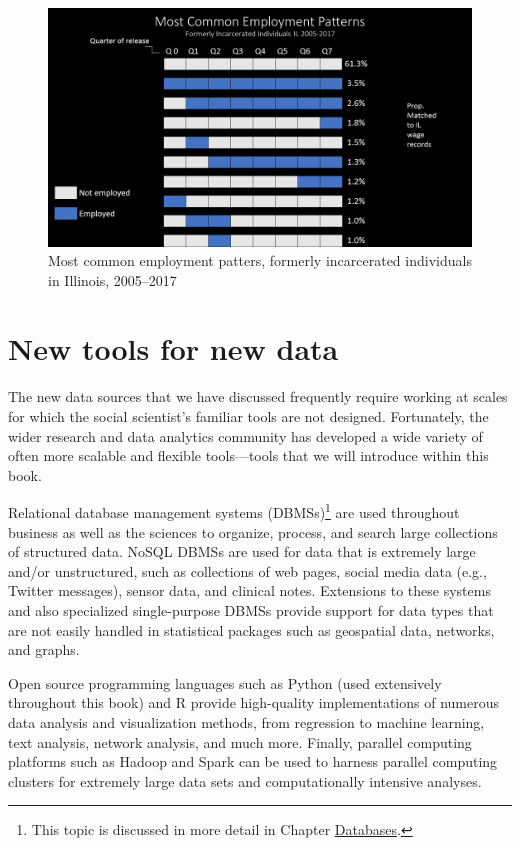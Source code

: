 \documentclass[]{krantz}
\begin{document}
\begin{figure}

{\centering \includegraphics[width=0.9\linewidth]{ChapterIntro/figures/patterns} 

}

\caption{Most common employment patters, formerly incarcerated individuals in Illinois, 2005--2017}\label{fig:patternfig}
\end{figure}

\hypertarget{sec:1-5}{\section{New tools for new data}\label{sec:1-5}}

The new data sources that we have discussed frequently require working
at scales for which the social scientist's familiar tools are not
designed. Fortunately, the wider research and data analytics community
has developed a wide variety of often more scalable and flexible
tools---tools that we will introduce within this book.

Relational database management systems (DBMSs)\footnote{This topic is
  discussed in more detail in Chapter
  \protect\hyperlink{chap:db}{Databases}.} are used throughout business
as well as the sciences to organize, process, and search large
collections of structured data. NoSQL DBMSs are used for data that is
extremely large and/or unstructured, such as collections of web pages,
social media data (e.g., Twitter messages), sensor data, and clinical
notes. Extensions to these systems and also specialized single-purpose
DBMSs provide support for data types that are not easily handled in
statistical packages such as geospatial data, networks, and graphs.

Open source programming languages such as Python (used extensively
throughout this book) and R provide high-quality implementations of
numerous data analysis and visualization methods, from regression to
machine learning, text analysis, network analysis, and much more.
Finally, parallel computing platforms such as Hadoop and Spark can be
used to harness parallel computing clusters for extremely large data
sets and computationally intensive analyses.
\end{document}
